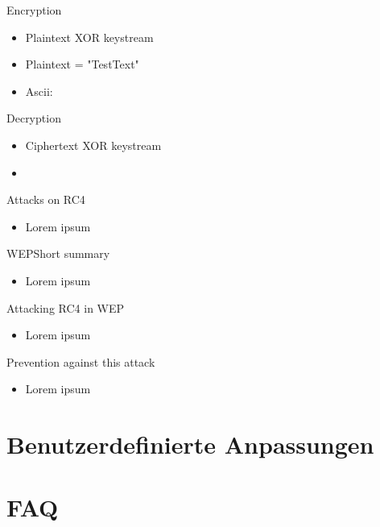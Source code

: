 \documentclass[
	aspectratio=169,	%
	onlytextwidth,		%
	t,					%
	]{beamer}
\begin{document}
\begin{frame}[fragile]{Encryption}
	\begin{itemize}
		\item Plaintext XOR keystream
		\item Plaintext = "TestText"
		\item Ascii: 
	\end{itemize}
\end{frame}

\begin{frame}[fragile]{Decryption}
	\begin{itemize}
		\item Ciphertext XOR keystream
		\item 
	\end{itemize}
\end{frame}

\begin{frame}[fragile]{Attacks on RC4}
	\begin{itemize}
		\item Lorem ipsum
	\end{itemize}
\end{frame}

\begin{frame}[fragile]{WEP}{Short summary}
	\begin{itemize}
		\item Lorem ipsum
	\end{itemize}
\end{frame}

\begin{frame}[fragile]{Attacking RC4 in WEP}
	\begin{itemize}
		\item Lorem ipsum
	\end{itemize}
\end{frame}

\begin{frame}[fragile]{Prevention against this attack}
	\begin{itemize}
		\item Lorem ipsum
	\end{itemize}
\end{frame}

\section{Benutzerdefinierte Anpassungen}

\section{FAQ}

\appendix
\makethankyou

\section{\appendixname}
\end{document}
